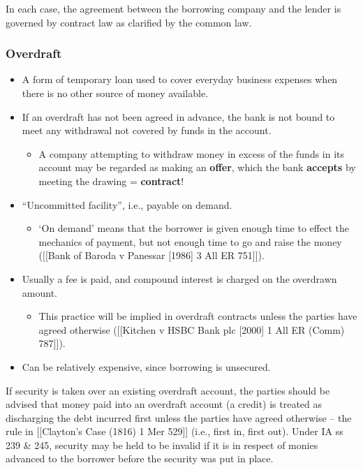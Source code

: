 \documentclass[
]{article}
\providecommand{\tightlist}{%
  \setlength{\itemsep}{0pt}\setlength{\parskip}{0pt}}
\begin{document}
In each case, the agreement between the borrowing company and the lender
is governed by contract law as clarified by the common law.

\hypertarget{overdraft}{%
\subsubsection{Overdraft}\label{overdraft}}

\begin{itemize}
\tightlist
\item
  A form of temporary loan used to cover everyday business expenses when
  there is no other source of money available.
\item
  If an overdraft has not been agreed in advance, the bank is not bound
  to meet any withdrawal not covered by funds in the account.

  \begin{itemize}
  \tightlist
  \item
    A company attempting to withdraw money in excess of the funds in its
    account may be regarded as making an \textbf{offer}, which the bank
    \textbf{accepts} by meeting the drawing = \textbf{contract}!
  \end{itemize}
\item
  ``Uncommitted facility'', i.e., payable on demand.

  \begin{itemize}
  \tightlist
  \item
    `On demand' means that the borrower is given enough time to effect
    the mechanics of payment, but not enough time to go and raise the
    money ({[}{[}Bank of Baroda v Panessar {[}1986{]} 3 All ER
    751{]}{]}).
  \end{itemize}
\item
  Usually a fee is paid, and compound interest is charged on the
  overdrawn amount.

  \begin{itemize}
  \tightlist
  \item
    This practice will be implied in overdraft contracts unless the
    parties have agreed otherwise ({[}{[}Kitchen v HSBC Bank plc
    {[}2000{]} 1 All ER (Comm) 787{]}{]}).
  \end{itemize}
\item
  Can be relatively expensive, since borrowing is unsecured.
\end{itemize}

If security is taken over an existing overdraft account, the parties
should be advised that money paid into an overdraft account (a credit)
is treated as discharging the debt incurred first unless the parties
have agreed otherwise -- the rule in {[}{[}Clayton's Case (1816) 1 Mer
529{]}{]} (i.e., first in, first out). Under IA ss 239 \& 245, security
may be held to be invalid if it is in respect of monies advanced to the
borrower before the security was put in place.
\end{document}
